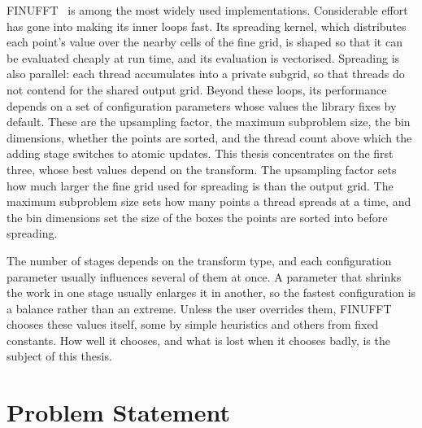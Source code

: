 FINUFFT~\cite{barnett2019} is among the most widely used implementations.
Considerable effort has gone into making its inner loops fast. Its spreading
kernel, which distributes each point's value over the nearby cells of the fine
grid, is shaped so that it can be evaluated cheaply at run time, and its
evaluation is vectorised. Spreading is also parallel: each thread
accumulates into a private subgrid, so that threads do not contend for the
shared output grid. Beyond these loops, its performance depends on a set of
configuration parameters whose values the library fixes by default. These are
the upsampling factor, the maximum subproblem size, the bin dimensions, whether
the points are sorted, and the thread count above which the adding stage
switches to atomic updates. This thesis concentrates on the first three, whose
best values depend on the transform. The upsampling factor sets how much larger
the fine grid used for spreading is than the output grid. The maximum
subproblem size sets how many points a thread spreads at a time, and the bin
dimensions set the size of the boxes the points are sorted into before
spreading.

The number of stages depends on the transform type, and each configuration
parameter usually influences several of them at once. A parameter that shrinks the work in one stage usually enlarges it in
another, so the fastest configuration is a balance rather than an extreme.
Unless the user overrides them, FINUFFT chooses these values itself, some by
simple heuristics and others from fixed constants.
How well it chooses, and what is lost when it chooses badly, is the subject of
this thesis.

\section{Problem Statement}
\label{sec:problem_statement}

